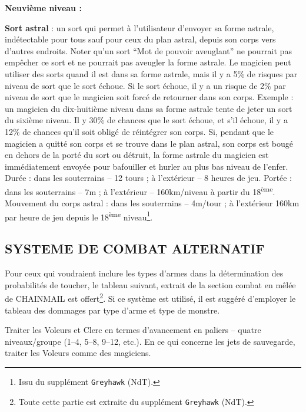 \documentclass[11pt]{article}
\begin{document}
{\bigskip

\textbf{Neuvième niveau :}

\bigskip

\textbf{Sort astral} : un sort qui permet à l'utilisateur d'envoyer sa forme astrale, indétectable pour tous sauf pour ceux du plan astral, depuis son corps vers d'autres endroits. Noter qu'un sort ``Mot de pouvoir aveuglant'' ne pourrait pas empêcher ce sort et ne pourrait pas aveugler la forme astrale. Le magicien peut utiliser des sorts quand il est dans sa forme astrale, mais il y a 5\% de risques par niveau de sort que le sort échoue. Si le sort échoue, il y a un risque de 2\% par niveau de sort que le magicien soit forcé de retourner dans son corps. Exemple : un magicien du dix-huitième niveau dans sa forme astrale tente de jeter un sort du sixième niveau. Il y  30\% de chances que le sort échoue, et s'il échoue, il y a 12\% de chances qu'il soit obligé de réintégrer son corps. Si, pendant que le magicien a quitté son corps et se trouve dans le plan astral, son corps est bougé en dehors de la porté du sort ou détruit, la forme astrale du magicien est immédiatement envoyée pour bafouiller et hurler au plus bas niveau de l'enfer. Durée : dans les souterrains -- 12 tours ; à l'extérieur -- 8 heures de jeu. Portée : dans les souterrains -- 7m ; à l'extérieur -- 160km/niveau à partir du 18\textsuperscript{ème}. Mouvement du corps astral : dans les souterrains -- 4m/tour ; à l'extérieur 160km par heure de jeu depuis le 18\textsuperscript{ème} niveau\footnote{Issu du supplément \texttt{Greyhawk} (NdT).}.

\subsection*{SYSTEME DE COMBAT ALTERNATIF}

Pour ceux qui voudraient inclure les types d'armes dans la détermination des probabilités de toucher, le tableau suivant, extrait de la section \og combat en mêlée \fg{} de CHAINMAIL est offert\footnote{Toute cette partie est extraite du supplément \texttt{Greyhawk} (NdT).}. Si ce système est utilisé, il est suggéré d'employer le tableau des dommages par type d'arme et type de monstre.

Traiter les Voleurs et Clerc en termes d'avancement en paliers -- quatre niveaux/groupe (1--4, 5--8, 9--12, etc.). En ce qui concerne les jets de sauvegarde, traiter les Voleurs comme des magiciens.

}
\end{document}
